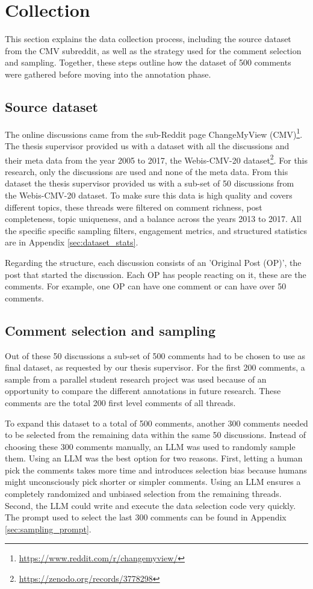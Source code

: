 \documentclass[
10pt, %
a4paper, %
oneside, %
headinclude,footinclude, %
] {book}%
\begin{document}
\section{Collection} 
This section explains the data collection process, including the source dataset from the CMV subreddit, as well as the strategy used for the comment selection and sampling. Together, these steps outline how the dataset of 500 comments were gathered before moving into the annotation phase.

\subsection{Source dataset}
\label{sec:CMV}
The online discussions came from the sub-Reddit page ChangeMyView (CMV)\footnote{\url{https://www.reddit.com/r/changemyview/}}. The thesis supervisor provided us with a dataset with all the discussions and their meta data from the year 2005 to 2017, the Webis-CMV-20 dataset\footnote{\url{https://zenodo.org/records/3778298}}. For this research, only the discussions are used and none of the meta data.  From this dataset the thesis supervisor provided us with a sub-set of 50 discussions from the Webis-CMV-20 dataset. To make sure this data is high quality and covers different topics, these threads were filtered on comment richness, post completeness, topic uniqueness, and a balance across the years 2013 to 2017. All the specific specific sampling filters, engagement metrics, and structured statistics are in Appendix \ref{sec:dataset_stats}. 

Regarding the structure, each discussion consists of an 'Original Post (OP)', the post that started the discussion. Each OP has people reacting on it, these are the comments. For example, one OP can have one comment or can have over 50 comments. 

\subsection{Comment selection and sampling}
Out of these 50 discussions a sub-set of 500 comments had to be chosen to use as final dataset, as requested by our thesis supervisor. For the first 200 comments, a sample from a parallel student research project was used because of an opportunity to compare the different annotations in future research. These comments are the total 200 first level comments of all threads.

To expand this dataset to a total of 500 comments, another 300 comments needed to be selected from the remaining data within the same 50 discussions. Instead of choosing these 300 comments manually, an LLM was used to randomly sample them. Using an LLM was the best option for two reasons. First, letting a human pick the comments takes more time and introduces selection bias because humans might unconsciously pick shorter or simpler comments. Using an LLM ensures a completely randomized and unbiased selection from the remaining threads. Second, the LLM could write and execute the data selection code very quickly. The prompt used to select the last 300 comments can be found in Appendix \ref{sec:sampling_prompt}.
\end{document}
